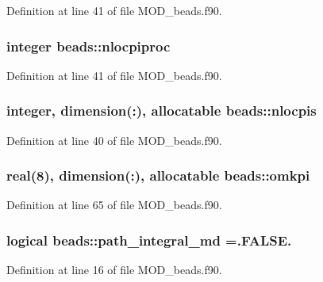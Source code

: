 Definition at line 41 of file M\-O\-D\-\_\-beads.\-f90.

\hypertarget{classbeads_a8d39e6ac2200cc21168d9e751abef466}{
\subsubsection[{nlocpiproc}]{\setlength{\rightskip}{0pt plus 5cm}integer beads\-::nlocpiproc}}\label{classbeads_a8d39e6ac2200cc21168d9e751abef466}


Definition at line 41 of file M\-O\-D\-\_\-beads.\-f90.

\hypertarget{classbeads_a10684bb3dabed29b62dd83a49c559e1f}{
\subsubsection[{nlocpis}]{\setlength{\rightskip}{0pt plus 5cm}integer, dimension(\-:), allocatable beads\-::nlocpis}}\label{classbeads_a10684bb3dabed29b62dd83a49c559e1f}


Definition at line 40 of file M\-O\-D\-\_\-beads.\-f90.

\hypertarget{classbeads_a6b2283331985cfc64992d31d7ede9b4d}{
\subsubsection[{omkpi}]{\setlength{\rightskip}{0pt plus 5cm}real(8), dimension(\-:), allocatable beads\-::omkpi}}\label{classbeads_a6b2283331985cfc64992d31d7ede9b4d}


Definition at line 65 of file M\-O\-D\-\_\-beads.\-f90.

\hypertarget{classbeads_a73d340bf9e10cc72a21f4efe65667093}{
\subsubsection[{path\-\_\-integral\-\_\-md}]{\setlength{\rightskip}{0pt plus 5cm}logical beads\-::path\-\_\-integral\-\_\-md =.F\-A\-L\-S\-E.}}\label{classbeads_a73d340bf9e10cc72a21f4efe65667093}


Definition at line 16 of file M\-O\-D\-\_\-beads.\-f90.


